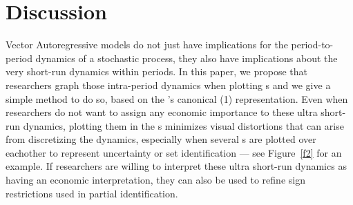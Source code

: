 \documentclass[12pt,fleqn]{article}
\begin{document}
\section{Discussion}

Vector Autoregressive models do not just have implications for the
period-to-period dynamics of a stochastic process, they also have
implications about the very short-run dynamics within periods. In this
paper, we propose that researchers graph those intra-period dynamics
when plotting \IRF s and we give a simple method to do so, based on
the \VAR's canonical \VAR(1) representation. Even when researchers do
not want to assign any economic importance to these ultra short-run
dynamics, plotting them in the \IRF s minimizes visual distortions
that can arise from discretizing the dynamics, especially when several
\IRF s are plotted over eachother to represent uncertainty or set
identification --- see Figure~\ref{f2} for an example. If researchers
are willing to interpret these ultra short-run dynamics as having an
economic interpretation, they can also be used to refine sign
restrictions used in partial identification.
\end{document}
